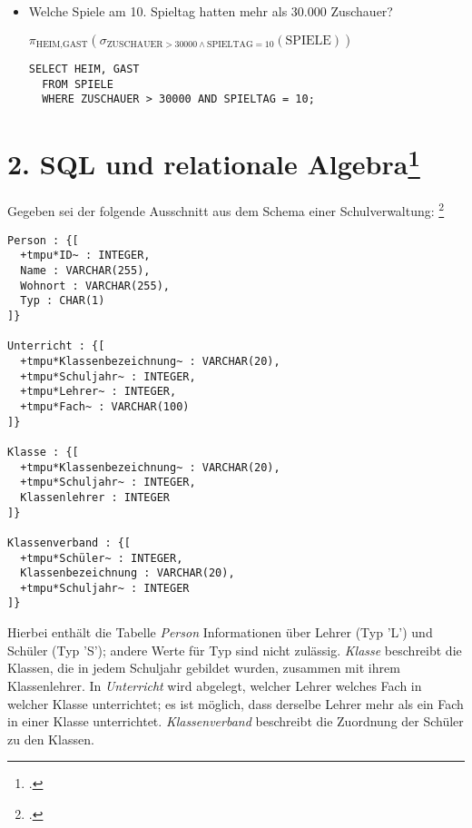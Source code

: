 \documentclass{lehramt-informatik}
\begin{document}
\begin{enumerate}
\begin{itemize}
%

\item Welche Spiele am 10. Spieltag hatten mehr als 30.000 Zuschauer?

\begin{antwort}
$\pi_{\text{HEIM,GAST}}(
  \sigma_{\text{ZUSCHAUER} > 30000 \land \text{SPIELTAG} = 10}(\text{SPIELE})
)$

\begin{verbatim}
SELECT HEIM, GAST
  FROM SPIELE
  WHERE ZUSCHAUER > 30000 AND SPIELTAG = 10;
\end{verbatim}
\end{antwort}
\end{itemize}
\end{enumerate}

%

\section{2. SQL und relationale Algebra\footcite{examen:66116:2016:09}}

Gegeben sei der folgende Ausschnitt aus dem Schema einer Schulverwaltung:
\footcite{db:ab:examen-gym-2016-09}

\newcommand{\tmpu}[1]{\underline{\texttt{#1}}}

\begin{Verbatim}[commandchars=+*~]
Person : {[
  +tmpu*ID~ : INTEGER,
  Name : VARCHAR(255),
  Wohnort : VARCHAR(255),
  Typ : CHAR(1)
]}

Unterricht : {[
  +tmpu*Klassenbezeichnung~ : VARCHAR(20),
  +tmpu*Schuljahr~ : INTEGER,
  +tmpu*Lehrer~ : INTEGER,
  +tmpu*Fach~ : VARCHAR(100)
]}

Klasse : {[
  +tmpu*Klassenbezeichnung~ : VARCHAR(20),
  +tmpu*Schuljahr~ : INTEGER,
  Klassenlehrer : INTEGER
]}

Klassenverband : {[
  +tmpu*Schüler~ : INTEGER,
  Klassenbezeichnung : VARCHAR(20),
  +tmpu*Schuljahr~ : INTEGER
]}
\end{Verbatim}

\noindent
Hierbei enthält die Tabelle \emph{Person} Informationen über Lehrer (Typ
’L’) und Schüler (Typ ’S’); andere Werte für Typ sind nicht zulässig.
\emph{Klasse} beschreibt die Klassen, die in jedem Schuljahr gebildet
wurden, zusammen mit ihrem Klassenlehrer. In \emph{Unterricht} wird
abgelegt, welcher Lehrer welches Fach in welcher Klasse unterrichtet; es
ist möglich, dass derselbe Lehrer mehr als ein Fach in einer Klasse
unterrichtet. \emph{Klassenverband} beschreibt die Zuordnung der Schüler
zu den Klassen.
\end{document}
